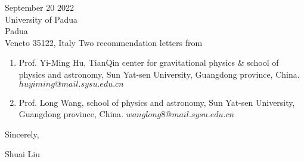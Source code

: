 \documentclass[11pt,a4paper,sans]{letter} %
\begin{document}
\begin{letter}{September 20 2022 \\
University of Padua\\
Padua\\ 
Veneto 35122, Italy}
Two recommendation letters from \begin{enumerate}[itemsep=-0pt,leftmargin=1.2em,topsep=-10pt]
\item Prof. Yi-Ming Hu, TianQin center for gravitational physics \& school of physics and astronomy, Sun Yat-sen University,
Guangdong province, China. $huyiming@mail.sysu.edu.cn$
\item Prof. Long Wang, school of physics and astronomy, Sun Yat-sen University, Guangdong province, China.
$wanglong8@mail.sysu.edu.cn$\\
\end{enumerate}


         
Sincerely,

Shuai Liu




\end{letter}
\end{document}
